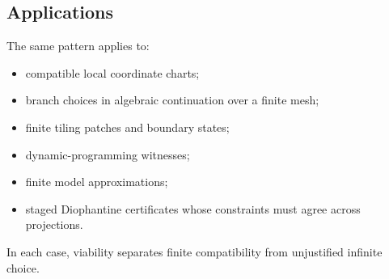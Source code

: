 \subsection{Applications}

The same pattern applies to:
\begin{itemize}
  \item compatible local coordinate charts;
  \item branch choices in algebraic continuation over a finite mesh;
  \item finite tiling patches and boundary states;
  \item dynamic-programming witnesses;
  \item finite model approximations;
  \item staged Diophantine certificates whose constraints must agree across
        projections.
\end{itemize}
In each case, viability separates finite compatibility from unjustified
infinite choice.
